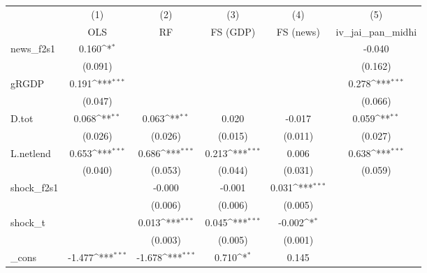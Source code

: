 {
\def\sym#1{\ifmmode^{#1}\else\(^{#1}\)\fi}
\begin{tabular}{l*{5}{c}}
\toprule
            &\multicolumn{1}{c}{(1)}&\multicolumn{1}{c}{(2)}&\multicolumn{1}{c}{(3)}&\multicolumn{1}{c}{(4)}&\multicolumn{1}{c}{(5)}\\
            &\multicolumn{1}{c}{OLS}&\multicolumn{1}{c}{RF}&\multicolumn{1}{c}{FS (GDP)}&\multicolumn{1}{c}{FS (news)}&\multicolumn{1}{c}{iv\_jai\_pan\_midhi}\\
\midrule
news\_f2s1   &       0.160\sym{*}  &                     &                     &                     &      -0.040         \\
            &     (0.091)         &                     &                     &                     &     (0.162)         \\
\addlinespace
gRGDP       &       0.191\sym{***}&                     &                     &                     &       0.278\sym{***}\\
            &     (0.047)         &                     &                     &                     &     (0.066)         \\
\addlinespace
D.tot       &       0.068\sym{**} &       0.063\sym{**} &       0.020         &      -0.017         &       0.059\sym{**} \\
            &     (0.026)         &     (0.026)         &     (0.015)         &     (0.011)         &     (0.027)         \\
\addlinespace
L.netlend   &       0.653\sym{***}&       0.686\sym{***}&       0.213\sym{***}&       0.006         &       0.638\sym{***}\\
            &     (0.040)         &     (0.053)         &     (0.044)         &     (0.031)         &     (0.059)         \\
\addlinespace
shock\_f2s1  &                     &      -0.000         &      -0.001         &       0.031\sym{***}&                     \\
            &                     &     (0.006)         &     (0.006)         &     (0.005)         &                     \\
\addlinespace
shock\_t     &                     &       0.013\sym{***}&       0.045\sym{***}&      -0.002\sym{*}  &                     \\
            &                     &     (0.003)         &     (0.005)         &     (0.001)         &                     \\
\addlinespace
\_cons      &      -1.477\sym{***}&      -1.678\sym{***}&       0.710\sym{*}  &       0.145         &                     \\

\end{tabular}}
